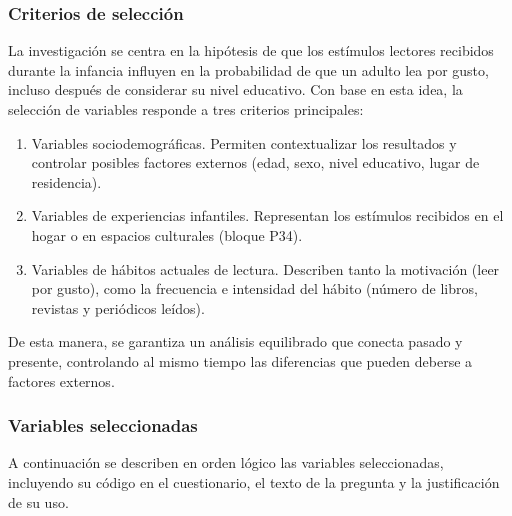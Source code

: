 \documentclass[aps,reprint]{revtex4-2}
\begin{document}
\subsubsection{Criterios de selección}
La investigación se centra en la hipótesis de que los estímulos lectores recibidos durante la infancia influyen en la probabilidad de que un adulto lea por gusto, incluso después de considerar su nivel educativo. Con base en esta idea, la selección de variables responde a tres criterios principales:

\begin{enumerate}
    \item Variables sociodemográficas. Permiten contextualizar los resultados y controlar posibles factores externos (edad, sexo, nivel educativo, lugar de residencia).
    \item Variables de experiencias infantiles. Representan los estímulos recibidos en el hogar o en espacios culturales (bloque P34).
    \item Variables de hábitos actuales de lectura. Describen tanto la motivación (leer por gusto), como la frecuencia e intensidad del hábito (número de libros, revistas y periódicos leídos).
\end{enumerate}

De esta manera, se garantiza un análisis equilibrado que conecta pasado y presente, controlando al mismo tiempo las diferencias que pueden deberse a factores externos.



\subsubsection{Variables seleccionadas}
A continuación se describen en orden lógico las variables seleccionadas, incluyendo su código en el cuestionario, el texto de la pregunta y la justificación de su uso.
\end{document}
